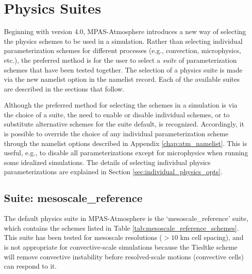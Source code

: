 \chapter{Physics Suites}
\label{chap:phys_suites}

Beginning with version 4.0, MPAS-Atmosphere introduces a new way of selecting the physics schemes to be used in a simulation. Rather than selecting individual parameterization schemes for different processes (e.g., convection, microphysics, etc.), the preferred method is for the user to select a {\em suite} of parameterization schemes that have been tested together. The selection of a physics suite is made via the new namelist option  in the  namelist record. Each of the available suites are described in the sections that follow.

Although the preferred method for selecting the schemes in a simulation is via the choice of a suite, the need to enable or disable individual schemes, or to substitute alternative schemes for the suite default, is recognized. Accordingly, it is possible to override the choice of any individual parameterization scheme through the namelist options described in Appendix \ref{chap:atm_namelist}. This is useful, e.g., to disable all parameterizations except for microphysics when running some idealized simulations. The details of selecting individual physics parameterizations are explained in Section \ref{sec:individual_physics_opts}.


\section{Suite: mesoscale\_reference}
\label{sec:phys_mesoscale_reference} 

The default physics suite in MPAS-Atmosphere is the `mesoscale\_reference' suite, which contains the schemes listed in Table \ref{tab:mesoscale_reference_schemes}. This suite has been tested for mesoscale resolutions ($>10$ km cell spacing), and is not appropriate for convective-scale simulations because the Tiedtke scheme will remove convective instability before resolved-scale motions (convective cells) can respond to it.

